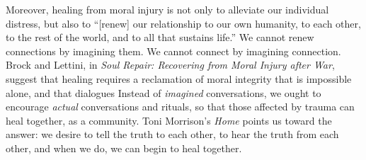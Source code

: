 \documentclass[12pt]{article}
\begin{document}
Moreover, healing from moral injury is not only to alleviate our individual
distress, but also to ``[renew] our relationship to our own humanity, to
each other, to the rest of the world, and to all that sustains
life.''\autocite[p.~116]{Brock12} We cannot renew connections by imagining them.
We cannot connect by imagining connection.  Brock and Lettini, in \textit{Soul
Repair: Recovering from Moral Injury after War},\autocite{Brock12} suggest that
healing requires a reclamation of moral integrity that is impossible alone, and
that dialogues \autocite[p.~112]{Brock12} Instead of \emph{imagined}
conversations, we ought to encourage \emph{actual} conversations and
rituals,\autocite{Brock15} so that those affected by trauma can heal together,
as a community. Toni Morrison's \emph{Home} points us toward the answer: we
desire to tell the truth to each other, to hear the truth from each other, and
when we do, we can begin to heal together.

\clearpage
\printbibliography

\end{document}
